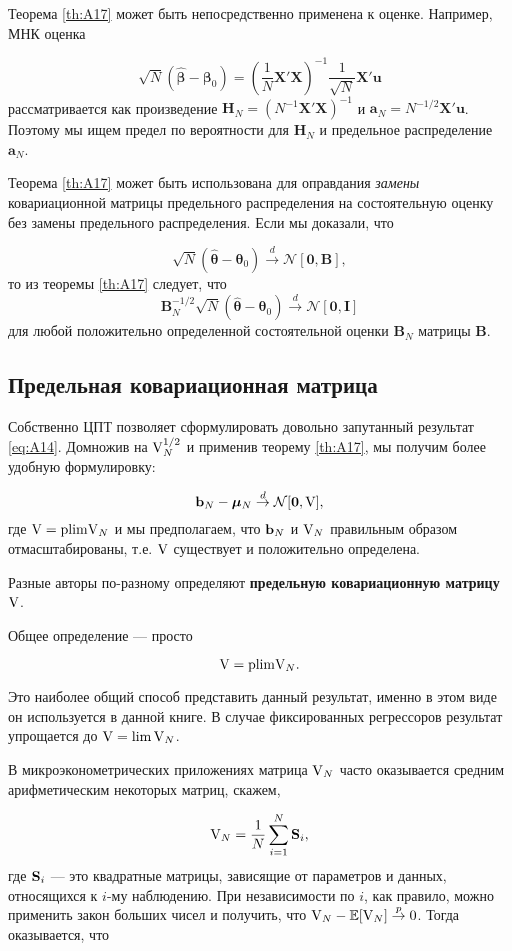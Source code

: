 Теорема \ref{th:A17} может быть непосредственно применена к оценке. Например, МНК оценка

\[
\sqrt{N}(\hat{\mathbf{\beta}}-\mathbf{\beta}_0)=
\left(
\frac{1}{N}\mathbf{X}'\mathbf{X}
\right)^{-1}
\frac{1}{\sqrt{N}}\mathbf{X}'\mathbf{u}
\]
рассматривается как произведение $\mathbf{H}_N=(N^{-1}\mathbf{X}'\mathbf{X})^{-1}$ и $\mathbf{a}_N=N^{-1/2}\mathbf{X}'\mathbf{u}$. Поэтому мы ищем предел по вероятности для $\mathbf{H}_N$ и предельное распределение $\mathbf{a}_N$.

Теорема \ref{th:A17} может быть использована для оправдания \textit{замены} ковариационной матрицы предельного распределения на состоятельную оценку без замены предельного распределения. Если мы доказали, что 

\[
\sqrt{N}(\hat{\mathbf{\theta}}-\mathbf{\theta}_0) \overset{d}{\to}
\mathcal{N}[\mathbf{0},\mathbf{B}],
\]
то из теоремы \ref{th:A17} следует, что
\[
\mathbf{B}_N^{-1/2}\sqrt{N}(\hat{\mathbf{\theta}}-\mathbf{\theta}_0) \overset{d}{\to}
\mathcal{N}[\mathbf{0},\mathbf{I}]
\]
для любой положительно определенной состоятельной оценки $\mathbf{B}_N$ матрицы $\mathbf{B}$.


\subsection{Предельная ковариационная матрица} %

Собственно ЦПТ позволяет сформулировать довольно запутанный результат \ref{eq:A14}. Домножив на $\mathbf{\mathrm{V}}_N^{1/2}$ и применив теорему \ref{th:A17}, мы получим более удобную формулировку:

\[
\mathbf{b}_N-\bm{\mu}_N \overset{d}{\to} \mathcal{N}[\mathbf{0},\mathbf{\mathrm{V}}],
\]
где $\mathbf{\mathrm{V}}=\mathrm{plim } \mathbf{\mathrm{V}}_N$ и мы предполагаем, что $\mathbf{b}_N$ и $\mathbf{\mathrm{V}}_N$ правильным образом отмасштабированы, т.е. $\mathbf{\mathrm{V}}$ существует и положительно определена.

Разные авторы по-разному определяют \textbf{предельную ковариационную матрицу} $\mathbf{\mathrm{V}}$. 

Общее определение --- просто

\[
\mathbf{\mathrm{V}} = \mathrm{plim } \mathbf{\mathrm{V}}_N.
\]

Это наиболее общий способ представить данный результат, именно в этом виде он используется в данной книге. В случае фиксированных регрессоров результат упрощается до $\mathbf{\mathrm{V}} = \lim \mathbf{\mathrm{V}}_N$.

В микроэконометрических приложениях матрица $\mathbf{\mathrm{V}}_N$ часто оказывается средним арифметическим некоторых матриц, скажем,

\[
\mathbf{\mathrm{V}}_N=\frac{1}{N}\sum_{i=1}^{N} \mathbf{S}_i,
\]
где $\mathbf{S}_i$ --- это квадратные матрицы, зависящие от параметров и данных, относящихся к $i$-му наблюдению. При независимости по $i$, как правило, можно применить закон больших чисел и получить, что $\mathbf{\mathrm{V}}_N-\mathbb{E}[\mathbf{\mathrm{V}}_N]\overset{p}{\to} 0$. Тогда оказывается, что


